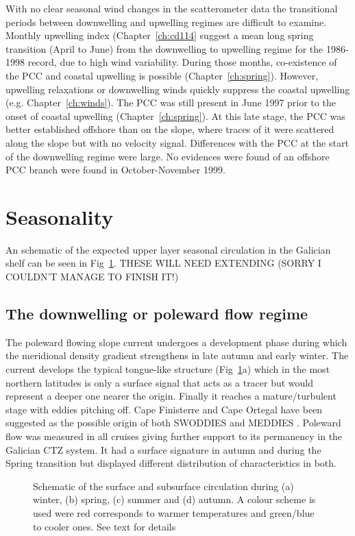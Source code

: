 With no clear seasonal wind changes in the scatterometer data the
transitional periods between downwelling and upwelling regimes are
difficult to examine. Monthly upwelling index
(Chapter~\ref{ch:cd114} suggest a mean long spring transition
(April to June) from the downwelling to upwelling regime for the
1986-1998 record, due to high wind variability. During those
months, co-existence of the PCC and coastal upwelling is possible
(Chapter~\ref{ch:spring}). However, upwelling relaxations or
downwelling winds quickly suppress the coastal upwelling (e.g.
Chapter~\ref{ch:winds}). The PCC was still present in June 1997
prior to the onset of coastal upwelling (Chapter~\ref{ch:spring}).
At this late stage, the PCC was better established offshore than
on the slope, where traces of it were scattered along the slope
but with no velocity signal. Differences with the PCC at the start
of the downwelling regime were large. No evidences were found of
an offshore PCC branch were found in October-November 1999.

\section{Seasonality} An schematic of the expected upper layer seasonal
circulation in the Galician shelf can be seen in
Fig~\ref{fig:concl_sketch}. THESE WILL NEED EXTENDING (SORRY I
COULDN'T MANAGE TO FINISH IT!)

\subsection{The downwelling or poleward flow regime}
The poleward flowing slope current undergoes a development phase
during which the meridional density gradient strengthens in late
autumn and early winter. The current develops the typical
tongue-like structure (Fig~\ref{fig:concl_sketch}a) which in the
most northern latitudes is only a surface signal that acts as a
tracer but would represent a deeper one nearer the origin. Finally
it reaches a mature/turbulent stage with eddies pitching off. Cape
Finisterre and Cape Ortegal have been suggested as the possible
origin of both SWODDIES \citep{Pingree92} and MEDDIES
\citep{Paillet02}. Poleward flow was measured in all cruises
giving further support to its permanency in the Galician CTZ
system. It had a surface signature in autumn and during the Spring
transition but displayed different distribution of characteristics
in both.

\begin{figure}
\centering \arribacap%
%
%
\caption{Schematic of the surface and subsurface circulation
during (a) winter, (b) spring, (c) summer and (d) autumn. A colour
scheme is used were red corresponds to warmer temperatures and
green/blue to cooler ones. See text for details }
\label{fig:concl_sketch}
\end{figure}

